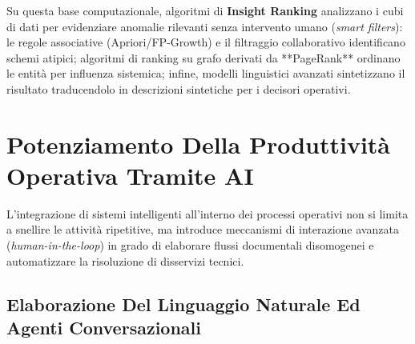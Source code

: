 \documentclass[11pt, a4paper]{article}
\begin{document}
Su questa base computazionale, algoritmi di \textbf{Insight Ranking} analizzano i cubi di dati per evidenziare anomalie rilevanti senza intervento umano (\emph{smart filters}): le regole associative (Apriori/FP-Growth) e il filtraggio collaborativo identificano schemi atipici; algoritmi di ranking su grafo derivati da **PageRank** ordinano le entità per influenza sistemica; infine, modelli linguistici avanzati sintetizzano il risultato traducendolo in descrizioni sintetiche per i decisori operativi.

\newpage


\section{Potenziamento Della Produttività Operativa Tramite AI}

L'integrazione di sistemi intelligenti all'interno dei processi operativi non si limita a snellire le attività ripetitive, ma introduce meccanismi di interazione avanzata (\emph{human-in-the-loop}) in grado di elaborare flussi documentali disomogenei e automatizzare la risoluzione di disservizi tecnici.



\subsection{Elaborazione Del Linguaggio Naturale Ed Agenti Conversazionali}
\end{document}
